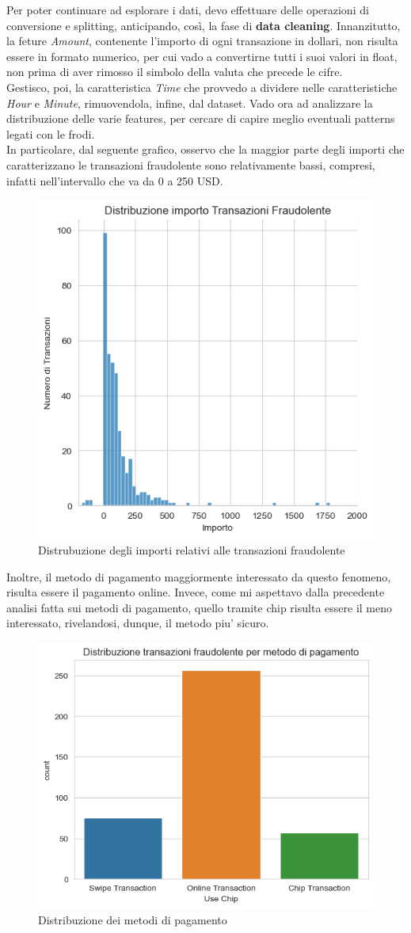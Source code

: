 \documentclass[]{article}
\begin{document}
        Per poter continuare ad esplorare i dati, devo effettuare delle operazioni di conversione e splitting, anticipando, così, la fase di \textbf{data cleaning}.
        Innanzitutto, la feture \textit{Amount}, contenente l'importo di ogni transazione in dollari, non risulta essere in formato numerico, per cui vado a convertirne tutti i suoi valori in float, non prima di aver rimosso il simbolo della valuta che precede le cifre.\\
        Gestisco, poi, la caratteristica \textit{Time} che provvedo a dividere nelle caratteristiche \textit{Hour} e \textit{Minute}, rimuovendola, infine, dal dataset.
        Vado ora ad analizzare la distribuzione delle varie features, per cercare di capire meglio eventuali patterns legati con le frodi.\\
        In particolare, dal seguente grafico, osservo che la maggior parte degli importi che caratterizzano le transazioni fraudolente sono relativamente bassi, compresi, infatti nell'intervallo che va da 0 a 250 USD.
        \begin{figure}[H]
            \centering
            \includegraphics[width=.4\textwidth]{img/DistribuzioneImporto.png}
            \caption[short]{Distrubuzione degli importi relativi alle transazioni fraudolente}
        \end{figure}
        Inoltre, il metodo di pagamento maggiormente interessato da questo fenomeno, risulta essere il pagamento online. Invece, come mi aspettavo dalla precedente analisi fatta sui metodi di pagamento, quello tramite chip risulta essere il meno interessato, rivelandosi, dunque, il metodo piu' sicuro.
        \begin{figure}[H]
            \centering
            \includegraphics[width=.4\textwidth]{img/DistribuzioneMetodoPagamento.png}
            \caption[short]{Distribuzione dei metodi di pagamento}
        \end{figure}
\end{document}
